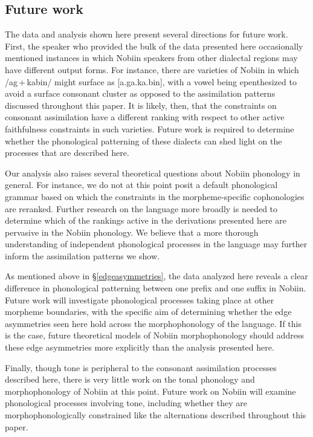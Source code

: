 \documentclass[output=paper]{langscibook}
\begin{document}
\subsection{Future work}
The data and analysis shown here present several directions for future work. First, the speaker who provided the bulk of the data presented here occasionally mentioned instances in which Nobiin speakers from other dialectal regions may have different output forms. For instance, there are varieties of Nobiin in which /ag\,+\,kabin/ might surface as [a.ga.ka.bin], with a vowel being epenthesized to avoid a surface consonant cluster as opposed to the assimilation patterns discussed throughout this paper. It is likely, then, that the constraints on consonant assimilation have a different ranking with respect to other active faithfulness constraints in such varieties. Future work is required to determine whether the phonological patterning of these dialects can shed light on the processes that are described here.

Our analysis also raises several theoretical questions about Nobiin phonology in general. For instance, we do not at this point posit a default phonological grammar based on which the constraints in the morpheme-specific cophonologies are reranked. Further research on the language more broadly is needed to determine which of the rankings active in the derivations presented here are pervasive in the Nobiin phonology. We believe that a more thorough understanding of independent phonological processes in the language may further inform the assimilation patterns we show. 

As mentioned above in \S \ref{edgeasymmetries}, the data analyzed here reveals a clear difference in phonological patterning between one prefix and one suffix in Nobiin. Future work will investigate phonological processes taking place at other morpheme boundaries, with the specific aim of determining whether the edge asymmetries seen here hold across the morphophonology of the language. If this is the case, future theoretical models of Nobiin morphophonology should address these edge asymmetries more explicitly than the analysis presented here.

Finally, though tone is peripheral to the consonant assimilation processes described here, there is very little work on the tonal phonology and morphophonology of Nobiin at this point. Future work on Nobiin will examine phonological processes involving tone, including whether they are morphophonologically constrained like the alternations described throughout this paper.
\end{document}

